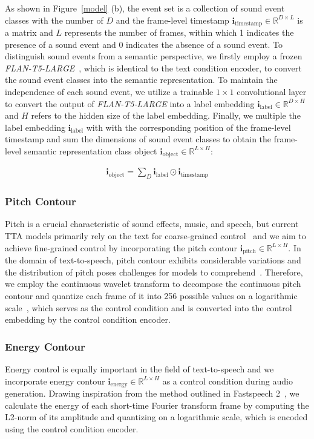 \documentclass[letterpaper]{article} %
\begin{document}
As shown in Figure~\ref{model} (b), the event set is a collection of sound event classes with the number of $D$ and the frame-level timestamp $\mathbf{i}_{\text{timestamp}} \in \mathbb{R}^{D \times L}$ is a matrix and $L$ represents the number of frames, within which 1 indicates the presence of a sound event and 0 indicates the absence of a sound event. To distinguish sound events from a semantic perspective, we firstly employ a frozen \textit{FLAN-T5-LARGE}~\cite{ghosal2023tango,chung2022siflm}, which is identical to the text condition encoder, to convert the sound event classes into the semantic representation. To maintain the independence of each sound event, we utilize a trainable $1 \times 1$ convolutional layer to convert the output of \textit{FLAN-T5-LARGE} into a label embedding $\mathbf{i}_{\text{label}} \in \mathbb{R}^{D \times H}$ and $H$ refers to the hidden size of the label embedding. Finally, we multiple the label embedding $\mathbf{i}_{\text{label}}$ with with the corresponding position of the frame-level timestamp and sum the dimensions of sound event classes to obtain the frame-level semantic representation class object $\mathbf{i}_{\text{object}} \in \mathbb{R}^{L \times H}$:

\begin{align}
\mathbf{i}_{\text{object}} = \sum_{D}{\mathbf{i}_{\text{label}} \odot \mathbf{i}_{\text{timestamp}}}
\end{align}

\subsubsection{Pitch Contour} Pitch is a crucial characteristic of sound effects, music, and speech, but current TTA models primarily rely on the text for coarse-grained control~\cite{liu2023audioldm} and we aim to achieve fine-grained control by incorporating the pitch contour $\mathbf{i}_{\text{pitch}} \in \mathbb{R}^{L \times H}$. In the domain of text-to-speech, pitch contour exhibits considerable variations and the distribution of pitch poses challenges for models to comprehend~\cite{ren2021fastspeech2}. Therefore, we employ the continuous wavelet transform to decompose the continuous pitch contour and quantize each frame of it into 256 possible values on a logarithmic scale~\cite{wuni2013wavelets,ren2021fastspeech2}, which serves as the control condition and is converted into the control embedding by the control condition encoder.

\subsubsection{Energy Contour} Energy control is equally important in the field of text-to-speech and we incorporate energy contour $\mathbf{i}_{\text{energy}} \in \mathbb{R}^{L \times H}$ as a control condition during audio generation. Drawing inspiration from the method outlined in Fastspeech 2~\cite{ren2021fastspeech2}, we calculate the energy of each short-time Fourier transform frame by computing the L2-norm of its amplitude and quantizing on a logarithmic scale, which is encoded using the control condition encoder.
\end{document}
